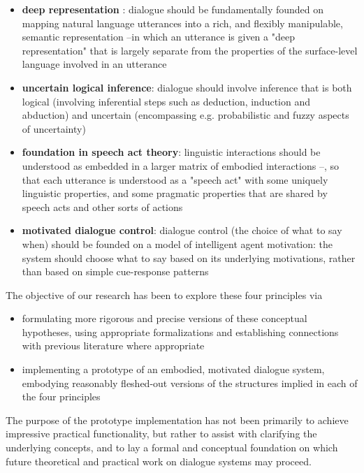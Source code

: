 \begin{englishabstract}
\begin{itemize}
\item {\bf deep representation }: dialogue should be fundamentally founded on mapping natural language utterances into a rich, and flexibly manipulable, semantic representation --in which an utterance is given a "deep representation" that is largely separate from the properties of the surface-level language involved in an utterance
\item {\bf uncertain logical inference}: dialogue should involve inference that is both logical (involving inferential steps such as deduction, induction and abduction) and uncertain (encompassing e.g. probabilistic and fuzzy aspects of uncertainty)
\item {\bf foundation in speech act theory}: linguistic interactions should be understood as embedded in a larger matrix of embodied interactions --, so that each utterance is understood as a "speech act" with some uniquely linguistic properties, and some pragmatic properties that are shared by speech acts and other sorts of actions
\item {\bf motivated dialogue control}:  dialogue control (the choice of what to say when) should be founded on a model of intelligent agent motivation: the system should choose what to say based on its underlying motivations, rather than based on simple cue-response patterns
\end{itemize} 

The objective of our research has been to explore these four principles via

\begin{itemize}
\item formulating more rigorous and precise versions of these conceptual hypotheses, using appropriate formalizations and establishing connections with previous literature where appropriate
\item implementing a prototype of an embodied, motivated dialogue system, embodying reasonably fleshed-out versions of the structures implied in each of the four principles
\end{itemize}

The purpose of the prototype implementation has not been primarily to achieve impressive practical functionality, but rather to assist with clarifying the underlying concepts, and to lay a formal and conceptual foundation on which future theoretical and practical work on dialogue systems may proceed.


\end{englishabstract}
